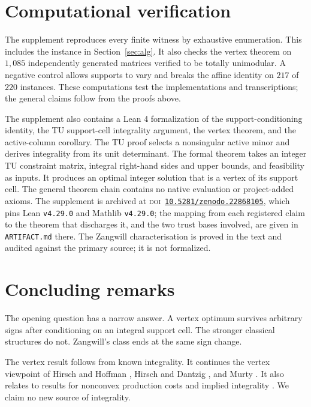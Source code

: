 \documentclass[3p,11pt]{elsarticle}
\theoremstyle{remark}
\theoremstyle{definition}
\begin{document}
\section{Computational verification}

The supplement reproduces every finite witness by exhaustive enumeration. This includes
the instance in Section~\ref{sec:alg}. It also checks the vertex theorem on
$1{,}085$ independently generated matrices verified to be totally unimodular. A negative
control allows supports to vary and breaks the affine identity on $217$ of $220$ instances.
These computations test the implementations and transcriptions; the general claims follow
from the proofs above.

The supplement also contains a Lean 4 formalization of the support-conditioning identity,
the TU support-cell integrality argument, the vertex theorem, and the active-column
corollary. The TU proof selects a nonsingular active minor and derives integrality from its
unit determinant. The formal theorem takes an integer TU constraint matrix, integral
right-hand sides and upper bounds, and feasibility as inputs. It produces an optimal
integer solution that is a vertex of its support cell. The general theorem chain contains
no native evaluation or project-added axioms.
The supplement is archived at \textsc{doi}~\href{https://doi.org/10.5281/zenodo.22868105}{\texttt{10.5281/zenodo.22868105}}, which pins Lean \texttt{v4.29.0} and Mathlib \texttt{v4.29.0}; the mapping from each registered claim to the theorem that discharges it, and the two trust bases involved, are given in \texttt{ARTIFACT.md} there. The Zangwill characterisation is proved in the text and audited against the primary source; it is not formalized.

\section{Concluding remarks}

The opening question has a narrow answer. A vertex optimum survives arbitrary signs after
conditioning on an integral support cell. The stronger classical structures do not.
Zangwill's class ends at the same sign change.

The vertex result follows from known integrality. It continues the vertex viewpoint
of Hirsch and Hoffman \cite{hh61}, Hirsch and Dantzig \cite{hd68}, and Murty
\cite{murty68}. It also relates to results for nonconvex production costs
\cite{jr73,sr82} and implied integrality \cite{hw26}. We claim no new source of
integrality.
\end{document}
